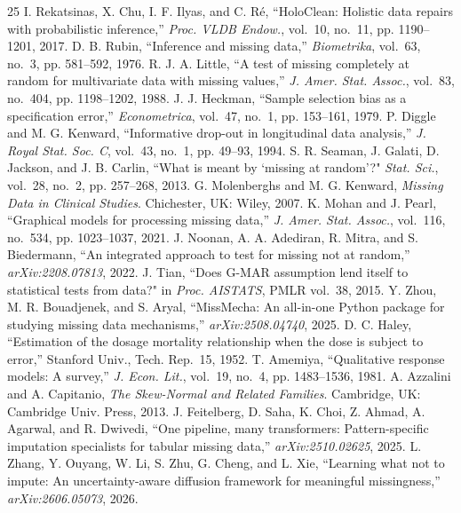 \documentclass[conference]{IEEEtran}
\begin{document}


\begin{thebibliography}{25}\small
{} I. Rekatsinas, X. Chu, I. F. Ilyas, and C. R\'e, ``HoloClean: Holistic data repairs with probabilistic inference,'' \emph{Proc. VLDB Endow.}, vol.~10, no.~11, pp. 1190--1201, 2017.
 D. B. Rubin, ``Inference and missing data,'' \emph{Biometrika}, vol.~63, no.~3, pp. 581--592, 1976.
 R. J. A. Little, ``A test of missing completely at random for multivariate data with missing values,'' \emph{J. Amer. Stat. Assoc.}, vol.~83, no.~404, pp. 1198--1202, 1988.
 J. J. Heckman, ``Sample selection bias as a specification error,'' \emph{Econometrica}, vol.~47, no.~1, pp. 153--161, 1979.
 P. Diggle and M. G. Kenward, ``Informative drop-out in longitudinal data analysis,'' \emph{J. Royal Stat. Soc. C}, vol.~43, no.~1, pp. 49--93, 1994.
 S. R. Seaman, J. Galati, D. Jackson, and J. B. Carlin, ``What is meant by `missing at random'?" \emph{Stat. Sci.}, vol.~28, no.~2, pp. 257--268, 2013.
 G. Molenberghs and M. G. Kenward, \emph{Missing Data in Clinical Studies}. Chichester, UK: Wiley, 2007.
 K. Mohan and J. Pearl, ``Graphical models for processing missing data,'' \emph{J. Amer. Stat. Assoc.}, vol.~116, no.~534, pp. 1023--1037, 2021.
 J. Noonan, A. A. Adediran, R. Mitra, and S. Biedermann, ``An integrated approach to test for missing not at random,'' \emph{arXiv:2208.07813}, 2022.
 J. Tian, ``Does G-MAR assumption lend itself to statistical tests from data?" in \emph{Proc. AISTATS}, PMLR vol.~38, 2015.
 Y. Zhou, M. R. Bouadjenek, and S. Aryal, ``MissMecha: An all-in-one Python package for studying missing data mechanisms,'' \emph{arXiv:2508.04740}, 2025.
 D. C. Haley, ``Estimation of the dosage mortality relationship when the dose is subject to error,'' Stanford Univ., Tech. Rep.~15, 1952.
 T. Amemiya, ``Qualitative response models: A survey,'' \emph{J. Econ. Lit.}, vol.~19, no.~4, pp. 1483--1536, 1981.
 A. Azzalini and A. Capitanio, \emph{The Skew-Normal and Related Families}. Cambridge, UK: Cambridge Univ. Press, 2013.
 J. Feitelberg, D. Saha, K. Choi, Z. Ahmad, A. Agarwal, and R. Dwivedi, ``One pipeline, many transformers: Pattern-specific imputation specialists for tabular missing data,'' \emph{arXiv:2510.02625}, 2025.
 L. Zhang, Y. Ouyang, W. Li, S. Zhu, G. Cheng, and L. Xie, ``Learning what not to impute: An uncertainty-aware diffusion framework for meaningful missingness,'' \emph{arXiv:2606.05073}, 2026.

\end{thebibliography}
\end{document}
